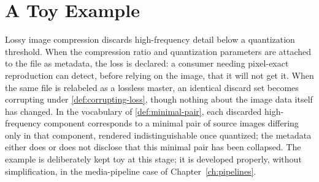 \section{A Toy Example}

\begin{example}
\label{ex:jpeg}
Lossy image compression discards high-frequency detail below a
quantization threshold. When the compression ratio and quantization
parameters are attached to the file as metadata, the loss is declared: a
consumer needing pixel-exact reproduction can detect, before relying on
the image, that it will not get it. When the same file is relabeled as a
lossless master, an identical discard set becomes corrupting under
\cref{def:corrupting-loss}, though nothing about the image data itself has
changed. In the vocabulary of \cref{def:minimal-pair}, each discarded
high-frequency component corresponds to a minimal pair of source images
differing only in that component, rendered indistinguishable once
quantized; the metadata either does or does not disclose that this
minimal pair has been collapsed. The example is deliberately kept toy at
this stage; it is developed properly, without simplification, in the
media-pipeline case of Chapter~\ref{ch:pipelines}.
\end{example}
